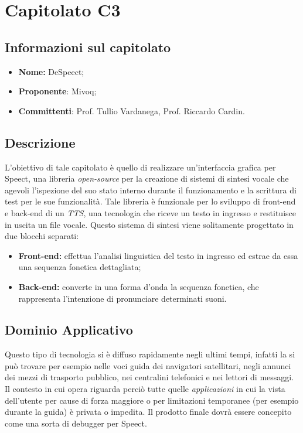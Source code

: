\section{Capitolato C3}
\subsection{Informazioni sul capitolato}
	\begin{itemize}
		\item \textbf{Nome:}
		DeSpeect;
		\item \textbf{Proponente}:
		Mivoq;
		\item \textbf{Committenti}:
		Prof. Tullio Vardanega, Prof. Riccardo Cardin.
	\end{itemize}

\subsection{Descrizione}
	L'obiettivo di tale capitolato è quello di realizzare un'interfaccia grafica per Speect, una libreria \textit{open-source} per la creazione di sistemi di sintesi vocale che agevoli l’ispezione del suo stato interno durante il funzionamento e la scrittura di test per le sue funzionalità.
	\newline \newline Tale libreria è funzionale per lo sviluppo di front-end e back-end di un \textit{TTS}, una tecnologia che riceve un testo in ingresso e restituisce in uscita un file vocale. Questo sistema di sintesi viene solitamente progettato in due blocchi separati:
	\begin{itemize}
		\item \textbf{Front-end:}
		effettua l'analisi linguistica del testo in ingresso ed estrae da essa una sequenza fonetica dettagliata;
		\item \textbf{Back-end:}
		converte in una forma d'onda la sequenza fonetica, che rappresenta l'intenzione di pronunciare determinati suoni.
	\end{itemize}

\subsection{Dominio Applicativo}
	 Questo tipo di tecnologia si è diffuso rapidamente negli ultimi tempi, infatti la si può trovare per esempio nelle voci guida dei navigatori satellitari, negli annunci dei mezzi di trasporto pubblico, nei centralini telefonici e nei lettori di messaggi.
	 \newline \newline Il contesto in cui opera riguarda perciò tutte quelle \textit{applicazioni} in cui la vista dell'utente per cause di forza maggiore o per limitazioni temporanee (per esempio durante la guida) è privata o impedita.
	 \newline \newline Il prodotto finale dovrà essere concepito come una sorta di debugger per Speect.

